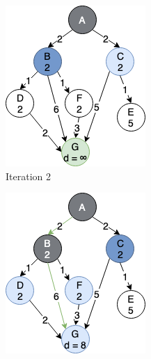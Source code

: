 \begin{figure}[h!]
\begin{subfigure}[b]{0.2\linewidth}
    \includegraphics[width=\linewidth]{images/a_star_expansion2.png}
     \caption{Iteration 2}
  \end{subfigure}
  \hfill
  \begin{subfigure}[b]{0.2\linewidth}
    \includegraphics[width=\linewidth]{images/a_star_expansion3.png}

\end{subfigure}
\end{figure}
